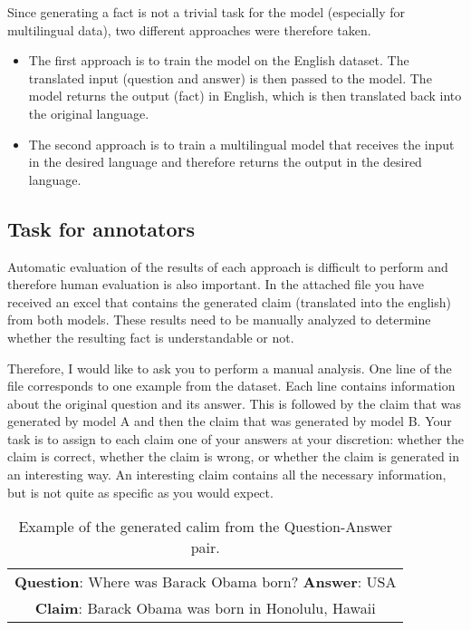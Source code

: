 Since generating a fact is not a trivial task for the model (especially for multilingual data), two different approaches were therefore taken. 
\begin{itemize}
    \item The first approach is to train the model on the English dataset. The translated input (question and answer) is then passed to the model. The model returns the output (fact) in English, which is then translated back into the original language.
    \item  The second approach is to train a multilingual model that receives the input in the desired language and therefore returns the output in the desired language.

\end{itemize}

\subsection*{Task for annotators}
Automatic evaluation of the results of each approach is difficult to perform and therefore human evaluation is also important. In the attached file you have received an excel that contains the generated claim (translated into the english) from both models. These results need to be manually analyzed to determine whether the resulting fact is understandable or not.

Therefore, I would like to ask you to perform a manual analysis. One line of the file corresponds to one example from the dataset. Each line contains information about the original question and its answer. This is followed by the claim that was generated by model A and then the claim that was generated by model B. Your task is to assign to each claim one of your answers at your discretion: whether the claim is correct, whether the claim is wrong, or whether the claim is generated in an interesting way. An interesting claim contains all the necessary information, but is not quite as specific as you would expect.

\begin{table}[h]
    \centering
    \begin{tabular}{c}
        \textbf{Question}: Where was Barack Obama born? \textbf{Answer}: USA\\
        \textbf{Claim}: Barack Obama was born in Honolulu, Hawaii
    \end{tabular}
    \caption{Example of the generated calim from the Question-Answer pair.}
\end{table}

